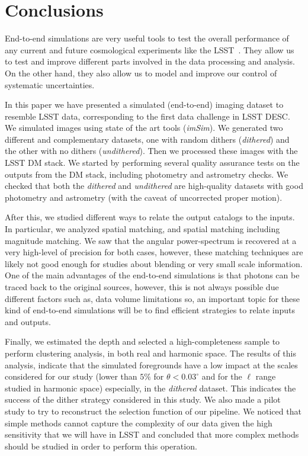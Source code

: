 \documentclass[\docopts]{\docclass}
\begin{document}
\section{Conclusions}
\label{sec:conclusions}

End-to-end simulations are very useful tools to test the overall performance of any current and future cosmological experiments like the LSST~\citep{2008arXiv0805.2366I}. They allow us to test and improve different parts involved in the data processing and analysis. On the other hand, they also allow us to model and improve our control of systematic uncertainties.

In this paper we have presented a simulated (end-to-end) imaging dataset to resemble LSST data, corresponding to the first data challenge in LSST DESC. We simulated images using state of the art tools (\textit{imSim}). We generated two different and complementary datasets, one with random dithers (\textit{dithered}) and the other with no dithers (\textit{undithered}). Then we processed these images with the LSST DM stack. We started by performing several quality assurance tests on the outputs from the DM stack, including photometry and astrometry checks. We checked that both the \textit{dithered} and \textit{undithered} are high-quality datasets with good photometry and astrometry (with the caveat of uncorrected proper motion). 

After this, we studied different ways to relate the output catalogs to the inputs. In particular, we analyzed spatial matching, and spatial matching including magnitude matching. We saw that the angular power-spectrum is recovered at a very high-level of precision for both cases, however, these matching techniques are likely not good enough for studies about blending or very small scale information. One of the main advantages of the end-to-end simulations is that photons can be traced back to the original sources, however, this is not always possible due different factors such as, data volume limitations so, an important topic for these kind of end-to-end simulations will be to find efficient strategies to relate inputs and outputs.
 
Finally, we estimated the depth and selected a high-completeness sample to perform clustering analysis, in both real and harmonic space. The results of this analysis, indicate that the simulated foregrounds have a low impact at the scales considered for our study (lower than $5\%$ for $\theta < 0.03^{\circ}$ and for the $\ell$ range studied in harmonic space) especially, in the \textit{dithered} dataset. This indicates the success of the dither strategy considered in this study. We also made a pilot study to try to reconstruct the selection function of our pipeline. We noticed that simple methods cannot capture the complexity of our data given the high sensitivity that we will have in LSST and concluded that more complex methods should be studied in order to perform this operation.
\end{document}
